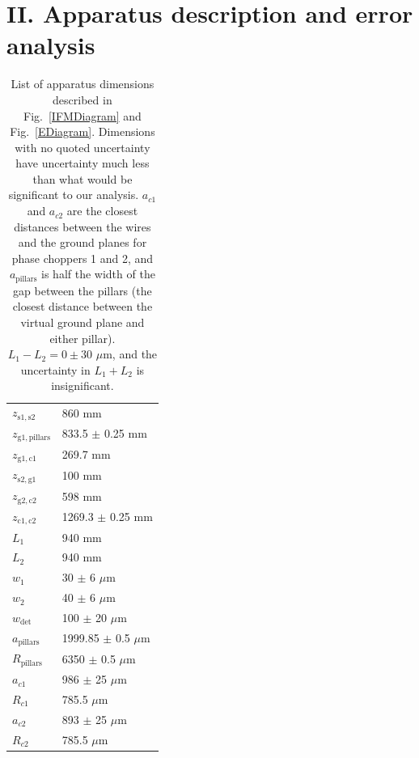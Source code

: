 \documentclass[twocolumn,prl,showpacs,superscriptaddress]{revtex4-1}   %
\newcommand{\figref}[1]{Fig.~\ref{#1}}
\begin{document}
\section{II. Apparatus description and error analysis}

\begingroup
\begin{table}
\caption{\label{tableDimensions}List of apparatus dimensions described in \figref{IFMDiagram} and \figref{EDiagram}. Dimensions with no quoted uncertainty have uncertainty much less than what would be significant to our analysis.
$a_{c1}$ and $a_{c2}$ are the closest distances between the wires and the ground planes for phase choppers 1 and 2, and $a_{\mathrm{pillars}}$ is half the width of the gap between the pillars (the closest distance between the virtual ground plane and either pillar). $L_1-L_2 = 0 \pm 30$ $\mu$m, and the uncertainty in $L_1 + L_2$ is insignificant.}
\begin{center}
\begin{tabular}{l l}
\hline\hline
$z_{\mathrm{s1,s2}}$ & 860 mm \\
$z_{\mathrm{g1,pillars}}$ & 833.5 $\pm$ 0.25 mm \\
$z_{\mathrm{g1,c1}}$ & 269.7 mm \\
$z_{\mathrm{s2,g1}}$ & 100 mm \\
$z_{\mathrm{g2,c2}}$ & 598 mm \\
$z_{\mathrm{c1,c2}}$ & 1269.3 $\pm$ 0.25 mm \\
$L_1$ & 940 mm \\
$L_2$ & 940 mm \\
$w_1$ & 30 $\pm$ 6 $\mu$m \\
$w_2$ & 40 $\pm$ 6 $\mu$m \\
$w_{\mathrm{det}}$ & 100 $\pm$ 20 $\mu$m \\ 
$a_{\mathrm{pillars}}$ & 1999.85 $\pm$ 0.5 $\mu$m \\
$R_{\mathrm{pillars}}$ & 6350 $\pm$ 0.5 $\mu$m \\
$a_{c1}$ & 986 $\pm$ 25 $\mu$m \\
$R_{c1}$ & 785.5 $\mu$m \\
$a_{c2}$ & 893 $\pm$ 25 $\mu$m \\
$R_{c2}$ & 785.5 $\mu$m \\
\hline\hline
\end{tabular}
\end{center}
\end{table}
\endgroup
\end{document}
